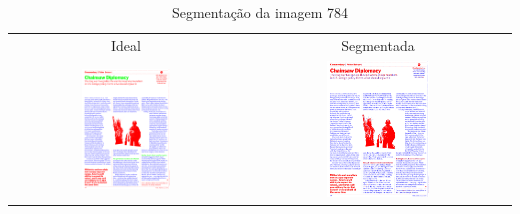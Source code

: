 \documentclass[a4paper,11pt]{article}
\begin{document}
    \begin{table}[p]
      \caption{Segmentação da imagem 784}
      \begin{center}
        \begin{tabular}{ c c }
          Ideal & Segmentada \\
          \includegraphics[width=0.4\textwidth]{assets/final_ideal/time_784_ideal.png}
          &
          \includegraphics[width=0.4\textwidth]{assets/result_imagens/time_50_percent_sparse_9x9_784_final.png}
        \end{tabular}
      \end{center}
      \label{tab:segmentation_784}
    \end{table}
\end{document}
